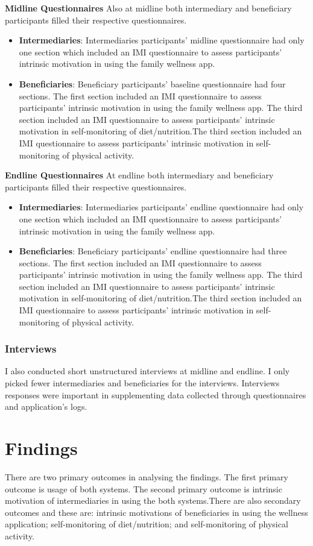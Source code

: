 \textbf{Midline Questionnaires}
Also at midline both intermediary and beneficiary participants filled their respective questionnaires. 
\begin{itemize}
\item{\textbf{Intermediaries}}: Intermediaries participants' midline questionnaire had only one section which included an IMI questionnaire  to assess participants' intrinsic motivation in using the family wellness app.
\item{\textbf{Beneficiaries}}: Beneficiary participants' baseline questionnaire had four sections. The first section included an IMI questionnaire  to assess participants' intrinsic motivation in using the family wellness app. The third section included an IMI questionnaire to assess participants' intrinsic motivation in self-monitoring of diet/nutrition.The third section included an IMI questionnaire to assess participants' intrinsic motivation in self-monitoring of physical activity.
\end{itemize}

\textbf{Endline Questionnaires}
At endline both intermediary and beneficiary participants filled their respective questionnaires. 
\begin{itemize}
\item{\textbf{Intermediaries}}: Intermediaries participants' endline questionnaire had only one section which included an IMI questionnaire  to assess participants' intrinsic motivation in using the family wellness app.
\item{\textbf{Beneficiaries}}: Beneficiary participants' endline questionnaire had three sections. The first section included an IMI questionnaire  to assess participants' intrinsic motivation in using the family wellness app. The third section included an IMI questionnaire to assess participants' intrinsic motivation in self-monitoring of diet/nutrition.The third section included an IMI questionnaire to assess participants' intrinsic motivation in self-monitoring of physical activity.
\end{itemize}
\subsubsection{Interviews}
I also conducted short unstructured interviews at midline and endline. I only picked fewer intermediaries and beneficiaries for the interviews. Interviews responses were important in supplementing data collected through questionnaires and application's logs.
\section{Findings}
There are two primary outcomes in analysing the findings. The first primary outcome is usage of both systems. The second primary outcome is intrinsic motivation of intermediaries in using the both systems.There are also secondary outcomes and these are: intrinsic motivations of beneficiaries in using the wellness application; self-monitoring of diet/nutrition; and self-monitoring of physical activity.
